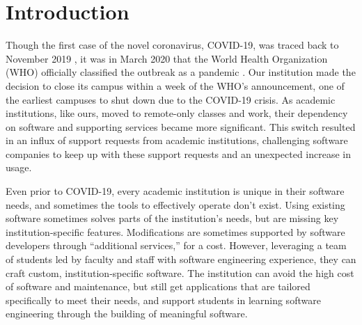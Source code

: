 \section{Introduction}


Though the first case of the novel coronavirus, COVID-19, was traced back to November 2019 \cite{}, it was in March 2020 that the World Health Organization (WHO) officially classified the outbreak as a pandemic \cite{}. Our institution made the decision to close its campus within a week of the WHO's announcement, one of the earliest campuses to shut down due to the COVID-19 crisis. As academic institutions, like ours, moved to remote-only classes and work, their dependency on software and supporting services became more significant. This switch resulted in an influx of support requests from academic institutions, challenging software companies to keep up with these support requests and an unexpected increase in usage.

Even prior to COVID-19, every academic institution is unique in their software needs, and sometimes the tools to effectively operate don't exist. Using existing software sometimes solves parts of the institution's needs, but are missing key institution-specific features. Modifications are sometimes supported by software developers through ``additional services,'' for a cost. However, leveraging a team of students led by faculty and staff with software engineering experience, they can craft custom, institution-specific software. The institution can avoid the high cost of software and maintenance, but still get applications that are tailored specifically to meet their needs, and support students in learning software engineering through the building of meaningful software.

